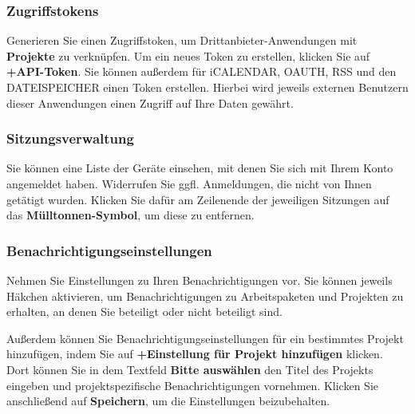\documentclass[
  letterpaper,
  DIV=11,
  numbers=noendperiod]{scrreprt}
\begin{document}
\subsubsection{Zugriffstokens}\label{zugriffstokens}

Generieren Sie einen Zugriffstoken, um Drittanbieter-Anwendungen mit
\textbf{Projekte} zu verknüpfen. Um ein neues Token zu erstellen,
klicken Sie auf \textbf{+API-Token}. Sie können außerdem für iCALENDAR,
OAUTH, RSS und den DATEISPEICHER einen Token erstellen. Hierbei wird
jeweils externen Benutzern dieser Anwendungen einen Zugriff auf Ihre
Daten gewährt.

\subsubsection{Sitzungsverwaltung}\label{sitzungsverwaltung}

Sie können eine Liste der Geräte einsehen, mit denen Sie sich mit Ihrem
Konto angemeldet haben. Widerrufen Sie ggfl. Anmeldungen, die nicht von
Ihnen getätigt wurden. Klicken Sie dafür am Zeilenende der jeweiligen
Sitzungen auf das \textbf{Mülltonnen-Symbol}, um diese zu entfernen.

\subsubsection{Benachrichtigungseinstellungen}\label{benachrichtigungseinstellungen}

Nehmen Sie Einstellungen zu Ihren Benachrichtigungen vor. Sie können
jeweils Häkchen aktivieren, um Benachrichtigungen zu Arbeitspaketen und
Projekten zu erhalten, an denen Sie beteiligt oder nicht beteiligt sind.

Außerdem können Sie Benachrichtigungseinstellungen für ein bestimmtes
Projekt hinzufügen, indem Sie auf \textbf{+Einstellung für Projekt
hinzufügen} klicken. Dort können Sie in dem Textfeld \textbf{Bitte
auswählen} den Titel des Projekts eingeben und projektspezifische
Benachrichtigungen vornehmen. Klicken Sie anschließend auf
\textbf{Speichern}, um die Einstellungen beizubehalten.
\end{document}
